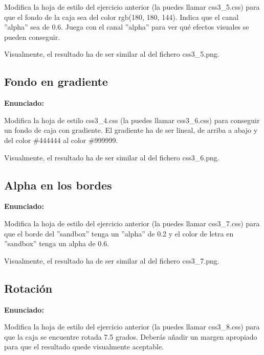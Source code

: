 Modifica la hoja de estilo del ejercicio anterior (la puedes llamar css3\_5.css) para que el fondo de la caja sea del color rgb(180, 180, 144). Indica que el canal ''alpha'' sea de 0.6. Juega con el canal ''alpha'' para ver qué efectos visuales se pueden conseguir.

Visualmente, el resultado ha de ser similar al del fichero css3\_5.png.

\subsection{Fondo en gradiente}
\label{subsec:gradiente}

\textbf{Enunciado:}

Modifica la hoja de estilo css3\_4.css (la puedes llamar css3\_6.css) para conseguir un fondo de caja con gradiente. El gradiente ha de ser lineal, de arriba a abajo y del color \#444444 al color \#999999.

Visualmente, el resultado ha de ser similar al del fichero css3\_6.png.

\subsection{Alpha en los bordes}
\label{subsec:alpha-bordes}

\textbf{Enunciado:}

Modifica la hoja de estilo del ejercicio anterior (la puedes llamar css3\_7.css) para que el borde del ''sandbox'' tenga un ''alpha'' de 0.2 y el color de letra en ''sandbox'' tenga un alpha de 0.6.

Visualmente, el resultado ha de ser similar al del fichero css3\_7.png.

\subsection{Rotación}
\label{subsec:rotacion}

\textbf{Enunciado:}

Modifica la hoja de estilo del ejercicio anterior (la puedes llamar css3\_8.css) para que la caja se encuentre rotada 7.5 grados. Deberás añadir un margen apropiado para que el resultado quede visualmente aceptable.

